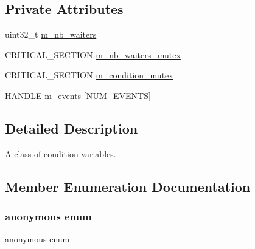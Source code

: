 \subsection*{Private Attributes}
\begin{DoxyCompactItemize}
\item 
uint32\+\_\+t \hyperlink{classmage_1_1_condition_variable_ac02cb14000a597ec91b8546bdcbb9dd1}{m\+\_\+nb\+\_\+waiters}
\item 
C\+R\+I\+T\+I\+C\+A\+L\+\_\+\+S\+E\+C\+T\+I\+ON \hyperlink{classmage_1_1_condition_variable_a0686e682d62d44ff1eb9ac45acbb0eab}{m\+\_\+nb\+\_\+waiters\+\_\+mutex}
\item 
C\+R\+I\+T\+I\+C\+A\+L\+\_\+\+S\+E\+C\+T\+I\+ON \hyperlink{classmage_1_1_condition_variable_ab5ff870b2881a1979ccaec986d762441}{m\+\_\+condition\+\_\+mutex}
\item 
H\+A\+N\+D\+LE \hyperlink{classmage_1_1_condition_variable_aa3eeb3cf7cdcc70e651ee67800b713f5}{m\+\_\+events} \mbox{[}\hyperlink{classmage_1_1_condition_variable_a600fb5094237230f6b260b31d6fb0945a2c43161b9ddfb393865606bfb3a51fac}{N\+U\+M\+\_\+\+E\+V\+E\+N\+TS}\mbox{]}
\end{DoxyCompactItemize}


\subsection{Detailed Description}
A class of condition variables. 

\subsection{Member Enumeration Documentation}
\hypertarget{classmage_1_1_condition_variable_a600fb5094237230f6b260b31d6fb0945}{}\label{classmage_1_1_condition_variable_a600fb5094237230f6b260b31d6fb0945} 
\subsubsection{\texorpdfstring{anonymous enum}{anonymous enum}}
{\footnotesize\ttfamily anonymous enum\hspace{0.3cm}{\ttfamily [private]}}

